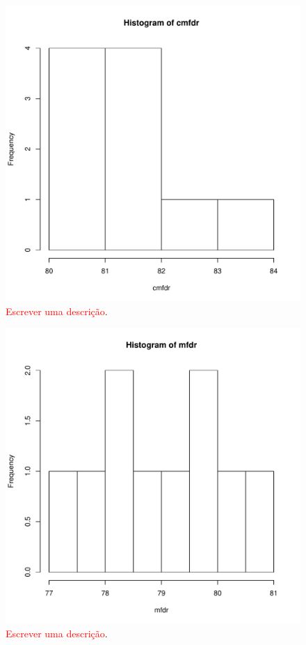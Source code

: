 \documentclass[conference]{IEEEtran}
\begin{document}
\begin{figure}[h]
	\centering
	\includegraphics[width=\linewidth]{img/hist_cmfdr.pdf}
	\caption{\textcolor{red}{Escrever uma descrição}.}
	\label{fig:hist_cmfdr}
\end{figure}

\begin{figure}[h]
	\centering
	\includegraphics[width=\linewidth]{img/hist_mfdr.pdf}
	\caption{\textcolor{red}{Escrever uma descrição}.}
	\label{fig:hist_mfdr}
\end{figure}
\end{document}

